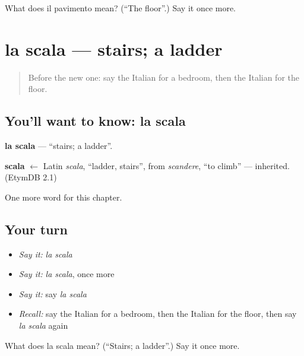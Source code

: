 \begin{tcolorbox}[breakable,colback=teal!4,colframe=teal!35!black,title={Before you move on}]
What does il pavimento mean? (\textquotedblleft{}The floor\textquotedblright{}.) Say it once more.
\end{tcolorbox}
\section[la scala]{la scala — stairs; a ladder}

\label{lesson:IT-C58-scala}



\begin{quote}
Before the new one: say the Italian for a bedroom, then the Italian for the floor.
\end{quote}

\subsection*{You'll want to know: la scala}
\textbf{la scala} — \textquotedblleft{}stairs; a ladder\textquotedblright{}.

\begin{cousinweb}
\textbf{scala} $\leftarrow$ Latin \emph{scala}, \textquotedblleft{}ladder, stairs\textquotedblright{}, from \emph{scandere}, \textquotedblleft{}to climb\textquotedblright{} — inherited. (EtymDB 2.1)
\end{cousinweb}

\begin{grammarlens}[title={What you've built}]
One more word for this chapter.
\end{grammarlens}

\subsection*{Your turn}
\begin{itemize}
\raggedright
  \item \emph{Say it:} \emph{la scala}
  \item \emph{Say it:} \emph{la scala}, once more
  \item \emph{Say it:} say \emph{la scala}
  \item \emph{Recall:} say the Italian for a bedroom, then the Italian for the floor, then say \emph{la scala} again
\end{itemize}

\begin{tcolorbox}[breakable,colback=teal!4,colframe=teal!35!black,title={Before you move on}]
What does la scala mean? (\textquotedblleft{}Stairs; a ladder\textquotedblright{}.) Say it once more.
\end{tcolorbox}
